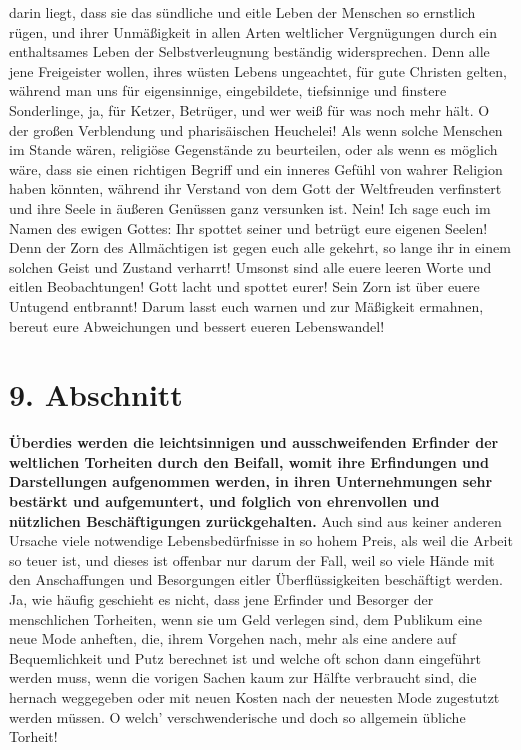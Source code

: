 darin liegt, dass sie das sündliche und eitle Leben der Menschen so ernstlich
rügen, und ihrer Unmäßigkeit in allen Arten weltlicher Vergnügungen durch ein
enthaltsames Leben der Selbstverleugnung beständig widersprechen. Denn alle jene
Freigeister wollen, ihres wüsten Lebens
ungeachtet, für gute Christen gelten,
während man uns für eigensinnige, eingebildete, tiefsinnige und finstere
Sonderlinge, ja, für Ketzer, Betrüger, und wer weiß für
was noch mehr hält. O der großen Verblendung und pharisäischen
Heuchelei!
Als wenn solche Menschen im
Stande wären, religiöse Gegenstände zu beurteilen, oder als wenn es möglich
wäre, dass sie einen richtigen Begriff und ein inneres Gefühl von wahrer
Religion
haben könnten, während ihr Verstand von dem Gott der Weltfreuden verfinstert
und ihre Seele in äußeren Genüssen ganz versunken ist. Nein! Ich sage euch im
Namen des ewigen Gottes: Ihr spottet seiner und betrügt eure eigenen Seelen!
Denn der Zorn des Allmächtigen ist gegen euch alle gekehrt, so lange ihr in
einem solchen Geist und Zustand verharrt! Umsonst sind alle euere leeren Worte
und eitlen Beobachtungen! Gott lacht und spottet eurer! Sein Zorn ist über euere
Untugend entbrannt! Darum lasst euch warnen und zur Mäßigkeit ermahnen, bereut
eure Abweichungen und bessert eueren Lebenswandel!

\section{9. Abschnitt} \label{kap17_ab9}

\label{ref:17_09_bedarf_wecken}
\textbf{Überdies werden die leichtsinnigen und
ausschweifenden Erfinder der weltlichen
Torheiten durch den Beifall, womit ihre Erfindungen und Darstellungen
aufgenommen werden, in ihren Unternehmungen sehr bestärkt und aufgemuntert, und
folglich von ehrenvollen und nützlichen Beschäftigungen zurückgehalten.} Auch
sind aus keiner anderen Ursache viele notwendige Lebensbedürfnisse in so hohem
Preis, als weil die Arbeit so teuer ist, und dieses ist offenbar nur darum der
Fall, weil so viele Hände mit den Anschaffungen und Besorgungen eitler
Überflüssigkeiten beschäftigt werden. Ja, wie häufig geschieht es nicht, dass
jene Erfinder und Besorger der menschlichen Torheiten, wenn sie um Geld
verlegen sind, dem Publikum eine neue Mode anheften, die, ihrem Vorgehen nach,
mehr als eine andere auf Bequemlichkeit und Putz berechnet ist und welche oft
schon dann eingeführt werden muss, wenn die vorigen Sachen kaum zur Hälfte
verbraucht sind, die hernach weggegeben oder mit neuen Kosten nach der neuesten
Mode zugestutzt werden müssen. O welch' verschwenderische und doch so allgemein
übliche Torheit!

